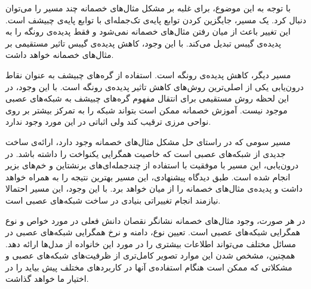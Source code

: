 \documentclass[12pt,onecolumn,a4paper]{article}
\begin{document}
با توجه به این موضوع، برای غلبه بر مشکل مثال‌های خصمانه چند مسیر را می‌توان دنبال کرد. یک مسیر، جایگزین کردن توابع پایه‌ی تک‌جمله‌ای با توابع پایه‌ی چبیشف است. این تغییر باعث از میان رفتن مثال‌های خصمانه نمی‌شود و فقط پدیده‌ی رونگه را به پدیده‌ی گیبس تبدیل می‌کند. با این وجود، کاهش پدیده‌ی گیبس تاثیر مستقیمی بر مثال‌های خصمانه خواهد داشت.

مسیر دیگر، کاهش پدیده‌ی رونگه است. استفاده از گره‌های چبیشف به عنوان نقاط درون‌یابی یکی از اصلی‌ترین روش‌های کاهش تاثیر پدیده‌ی رونگه است. با این وجود، در این لحظه روش مستقیمی برای انتقال مفهوم گره‌های چبیشف به شبکه‌های عصبی موجود نیست. آموزش خصمانه ممکن است بتواند شبکه را به تمرکز بیشتر بر روی نواحی مرزی ترقیب کند ولی اثباتی در این مورد وجود ندارد.

مسیر سومی که در راستای حل مشکل مثال‌های خصمانه وجود دارد، ارائه‌ی ساخت جدیدی از شبکه‌های عصبی است که خاصیت همگرایی یکنواخت را داشته باشد. در درون‌یابی، این مسیر با موفقیت با استفاده از چندجمله‌ای‌های برنشتاین و خم‌های بزیر انجام شده است. طبق دیدگاه پیشنهادی، این مسیر بهترین نتیجه را به همراه خواهد داشت و پدیده‌ی مثال‌های خصمانه را از میان خواهد برد. با این وجود، این مسیر احتمالا نیازمند انجام تغییراتی بنیادی در ساخت شبکه‌های عصبی است.

در هر صورت، وجود مثال‌های خصمانه نشانگر نقصان دانش فعلی در مورد خواص و نوع همگرایی شبکه‌های عصبی است. تعیین نوع، دامنه و نرخ همگرایی شبکه‌های عصبی در مسائل مختلف  می‌تواند اطلاعات بیشتری را در مورد این خانواده از مدل‌ها ارائه دهد. همچنین، مشخص شدن این موارد تصویر کامل‌تری از ظرفیت‌های شبکه‌های عصبی و مشکلاتی که ممکن است هنگام استفاده‌ی آنها در کاربردهای مختلف پیش بیاید را در اختیار ما خواهد گذاشت.
\end{document}
